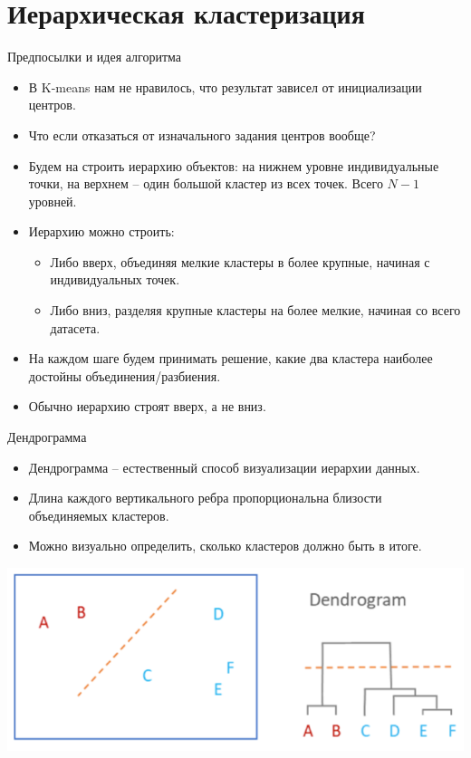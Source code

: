 \documentclass[9pt]{beamer}
\begin{document}
\section{Иерархическая кластеризация}

\begin{frame}{Предпосылки и идея алгоритма}
\begin{itemize}
    \item В K-means нам не нравилось, что результат зависел от инициализации центров.
    \item Что если отказаться от изначального задания центров вообще?
    \item Будем на строить иерархию объектов: на нижнем уровне индивидуальные точки, на верхнем -- один большой кластер из всех точек. Всего $N-1$ уровней.
    \item Иерархию можно строить:
    \begin{itemize}
        \item Либо вверх, объединяя мелкие кластеры в более крупные, начиная с индивидуальных точек.
        \item Либо вниз, разделяя крупные кластеры на более мелкие, начиная со всего датасета.
    \end{itemize}
    \item На каждом шаге будем принимать решение, какие два кластера наиболее достойны объединения/разбиения.
    \item Обычно иерархию строят вверх, а не вниз.
\end{itemize}
\end{frame}

\begin{frame}{Дендрограмма}
    \begin{itemize}
        \item Дендрограмма -- естественный способ визуализации иерархии данных.
        \item Длина каждого вертикального ребра пропорциональна близости объединяемых кластеров.
        \item Можно визуально определить, сколько кластеров должно быть в итоге.
    \end{itemize}
    \includegraphics[width=\textwidth]{img/dendrogram_example.png}
\end{frame}
\end{document}
